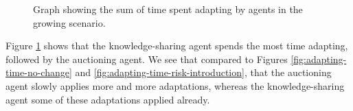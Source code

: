 \begin{figure}[H]
    \hspace*{-1cm}
    \centering
        
    \caption{Graph showing the sum of time spent adapting by agents in the growing scenario.}
    \label{fig:adapting-time-growing}
\end{figure}

Figure \ref{fig:adapting-time-growing} shows that the knowledge-sharing agent spends the most time adapting, followed by the auctioning agent. We see that compared to Figures \ref{fig:adapting-time-no-change} and \ref{fig:adapting-time-risk-introduction}, that the auctioning agent slowly applies more and more adaptations, whereas the knowledge-sharing agent some of these adaptations applied already. 
